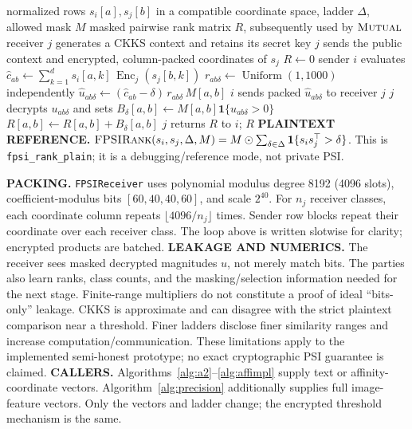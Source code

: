 \documentclass[11pt]{article}
\newcommand{\mutual}{\textsc{Mutual}}
\newcommand{\fprank}{\textsc{FPSIRank}}
\newcommand{\ind}{\mathbf{1}}
\begin{document}
\begin{algorithm}[p]
\caption{Implemented CKKS labeled fuzzy-PSI rank comparison}
\label{alg:fpsimpl}
\footnotesize\begin{algorithmic}[1]
\Require normalized rows $s_i[a],s_j[b]$ in a compatible coordinate space, ladder $\Delta$, allowed mask $M$
\Ensure masked pairwise rank matrix $R$, subsequently used by $\mutual$
 \State receiver $j$ generates a CKKS context and retains its secret key
 \State $j$ sends the public context and encrypted, column-packed coordinates of $s_j$
 \State $R\gets0$
  \State sender $i$ evaluates $\widehat c_{ab}\gets\sum_{k=1}^{d}s_i[a,k]\,\operatorname{Enc}_j(s_j[b,k])$
   \State $r_{ab\delta}\gets\operatorname{Uniform}(1,1000)$ independently
   \State $\widehat u_{ab\delta}\gets(\widehat c_{ab}-\delta)\,r_{ab\delta}\,M[a,b]$
   \State $i$ sends packed $\widehat u_{ab\delta}$ to receiver $j$
   \State $j$ decrypts $u_{ab\delta}$ and sets $B_\delta[a,b]\gets M[a,b]\ind\{u_{ab\delta}>0\}$
   \State $R[a,b]\gets R[a,b]+B_\delta[a,b]$
  \EndFor
 \EndFor
 \State $j$ returns $R$ to $i$; \Return $R$
\EndProcedure
\Statex \hrulefill
\Statex \textbf{PLAINTEXT REFERENCE.}
$\fprank(s_i,s_j,\Delta,M)=M\odot\sum_{\delta\in\Delta}\ind\{s_is_j^\top>\delta\}$.
This is \texttt{fpsi\_rank\_plain}; it is a debugging/reference mode, not private PSI.
\Statex
\Statex \raggedright\textbf{PACKING.} \texttt{FPSIReceiver} uses polynomial modulus degree
8192 (4096 slots), coefficient-modulus bits $[60,40,40,60]$, and scale $2^{40}$.
For $n_j$ receiver classes, each coordinate column repeats $\lfloor4096/n_j\rfloor$
times. Sender row blocks repeat their coordinate over each receiver class.
The loop above is written slotwise for clarity; encrypted products are batched.
\Statex
\Statex \textbf{LEAKAGE AND NUMERICS.} The receiver sees masked decrypted
magnitudes $u$, not merely match bits. The parties also learn ranks, class
counts, and the masking/selection information needed for the next stage.
Finite-range multipliers do not constitute a proof of ideal ``bits-only''
leakage. CKKS is approximate and can disagree with the strict plaintext
comparison near a threshold. Finer ladders disclose finer similarity ranges
and increase computation/communication. These limitations apply to the
implemented semi-honest prototype; no exact cryptographic PSI guarantee is claimed.
\Statex
\Statex \textbf{CALLERS.} Algorithms~\ref{alg:a2}--\ref{alg:affimpl} supply
text or affinity-coordinate vectors. Algorithm~\ref{alg:precision} additionally
supplies full image-feature vectors. Only the vectors and ladder change;
the encrypted threshold mechanism is the same.
\end{algorithmic}\end{algorithm}
\end{document}
